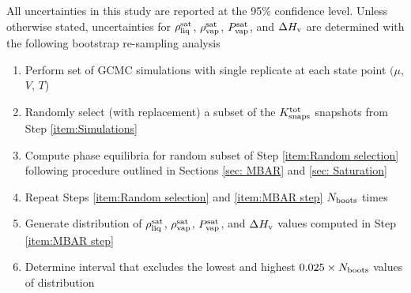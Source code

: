 \documentclass[journal=jced,manuscript=article]{achemso}
\begin{document}
All uncertainties in this study are reported at the 95\% confidence level. Unless otherwise stated, uncertainties for $\rho_{\rm liq}^{\rm sat}$, $\rho_{\rm vap}^{\rm sat}$, $P_{\rm vap}^{\rm sat}$, and $\Delta H_{\rm v}$ are determined with the following bootstrap re-sampling analysis \cite{Efron1979}


\begin{enumerate}
	\item Perform set of GCMC simulations with single replicate at each state point $(\mu$, $V$, $T$) \label{item:Simulations}
	\item Randomly select (with replacement) a subset of the $K^{\rm tot}_{\rm snaps}$ snapshots from Step \ref{item:Simulations} \label{item:Random selection}
	\item Compute phase equilibria for random subset of Step \ref{item:Random selection} following procedure outlined in Sections \ref{sec: MBAR} and \ref{sec: Saturation} \label{item:MBAR step}
	\item Repeat Steps \ref{item:Random selection} and \ref{item:MBAR step} $N_{\rm boots}$ times \label{item:Loop}
	\item Generate distribution of $\rho_{\rm liq}^{\rm sat}$, $\rho_{\rm vap}^{\rm sat}$, $P_{\rm vap}^{\rm sat}$, and $\Delta H_{\rm v}$ values computed in Step \ref{item:MBAR step}
	\item Determine interval that excludes the lowest and highest $0.025 \times N_{\rm boots}$ values of distribution
\end{enumerate}




\end{document}
